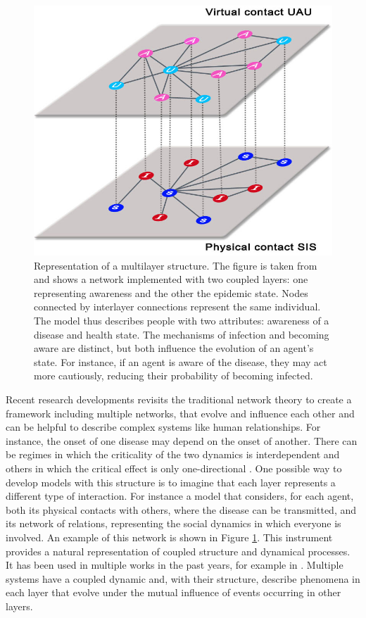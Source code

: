 \begin{figure}[ht]
	\centering
	\includegraphics[width=0.5\linewidth]{0_introduction/images_introduction/multi_layer}
	\caption[Multi-layer network]{Representation of a multilayer structure. The figure is taken from \cite{Granell2013} and shows a network implemented with two coupled layers: one representing awareness and the other the epidemic state. Nodes connected by interlayer connections represent the same individual. The model thus describes people with two attributes: awareness of a disease and health state. The mechanisms of infection and becoming aware are distinct, but both influence the evolution of an agent's state. For instance, if an agent is aware of the disease, they may act more cautiously, reducing their probability of becoming infected.}
	\label{fig:multilayer}
\end{figure} 

Recent research developments revisits the traditional network theory to create a framework including multiple networks, that evolve and influence each other \cite{DeDomenico2016, Krickel_2023} and can be helpful to describe complex systems like human relationships. For instance, the onset of one disease may depend on the onset of another. There can be regimes in which the criticality of the two dynamics is interdependent and others in which the critical effect is only one-directional \cite{DeDomenico2016}. 
One possible way to develop models with this structure is to imagine that each layer represents a different type of interaction. For instance a model that considers, for each agent, both its physical contacts with others, where the disease can be transmitted, and its network of relations, representing the social dynamics in which everyone is involved. An example of this network is shown in Figure \ref{fig:multilayer}. This instrument provides a natural representation of coupled structure and dynamical processes. It has been used in multiple works in the past years, for example in \cite{Wang_2019}. 
Multiple systems have a coupled dynamic and, with their structure, describe phenomena in each layer that evolve under the mutual influence of events occurring in other layers.


